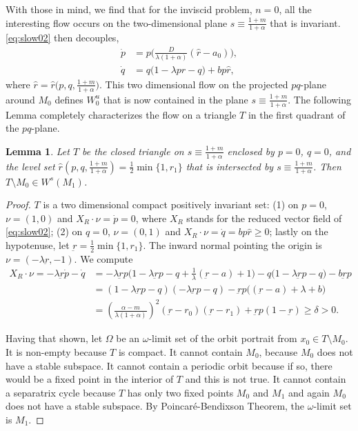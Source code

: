 \documentclass[a4paper,11pt]{article}
\newtheorem{lemma}{Lemma}[section]
\theoremstyle{remark}
\begin{document}
With those in mind, we find that for the inviscid problem, $n=0$, all the interesting flow occurs on the two-dimensional plane $s\equiv \frac{1+m}{1+\alpha}$ that is invariant. \eqref{eq:slow02} then decouples,
\begin{equation}\label{eq:slow03}
 \begin{aligned}
 \dot{p} &= p\Big(\frac{D}{\lambda(1+\alpha)}(\hat{r}-a_0)\Big),\\
 \dot{q} &= q\Big(1 -\lambda p \hat{r} -q\Big) + b p \hat{r}, 
 \end{aligned}
\end{equation}
where $\hat{r}=\hat{r}\big(p,q,\frac{1+m}{1+\alpha}\big)$. This two dimensional flow on the projected $pq$-plane around $M_0$ defines $W_0^u$ that is now contained in the plane $s\equiv \frac{1+m}{1+\alpha}$.
The following Lemma completely characterizes the flow on a triangle $T$ in the first quadrant of the $pq$-plane. 
\begin{lemma} \label{lem:T}
 Let $T$ be the closed triangle on $s\equiv \frac{1+m}{1+\alpha}$ enclosed by $p=0$, $q=0$, and the level set $\hat{r}(p,q,\frac{1+m}{1+\alpha})= \frac{1}{2}\min\{1,r_1\}$ that is intersected by $s\equiv \frac{1+m}{1+\alpha}$. 
 Then $T\setminus M_0 \in W^s(M_1)$.
\end{lemma}
\begin{proof}
$T$ is a two dimensional compact positively invariant set: (1) on $p=0$, $\nu = (1,0)$ and $X_R\cdot\nu = \dot{p}=0$, where $X_R$ stands for the reduced vector field of \eqref{eq:slow02};
 (2) on $q=0$, $\nu = (0,1)$ and $X_R\cdot\nu=\dot{q} = bp\hat{r}\ge0$; lastly on the hypotenuse, let $\underbar{r}=\frac{1}{2}\min\{1,r_1\}$. The inward normal pointing the origin is $\nu = (-\lambda\underbar{r}, -1)$. We compute
  \begin{align}
  X_R\cdot\nu=-\lambda\underbar{r}\dot{p} -\dot{q}&= -\lambda \underbar{r}p \Big(1-\lambda \underbar{r}p -q + \frac{1}{\lambda}(\underbar{r}-a)+1\Big) - q(1-\lambda \underbar{r}p -q\big) - b \underbar{r}p \nonumber\\
  &= (1-\lambda \underbar{r}p -q)(-\lambda \underbar{r}p -q) -\underbar{r}p\Big((\underbar{r}-a)+\lambda+b\Big)\nonumber\\
  &= \left(\frac{\alpha-m}{\lambda(1+\alpha)}\right)^2(\underbar{r}-r_0)(\underbar{r}-r_1)+\underbar{r}p(1-\underbar{r})\ge \delta>0. \label{eq:affine}
 \end{align}

Having that shown, let $\Omega$ be an $\omega$-limit set of the orbit portrait from $x_0\in T\setminus M_0$. It is non-empty because $T$ is compact. It cannot contain $M_0$, because $M_0$ does not have a stable subspace. It cannot contain a periodic orbit because if so, there would be a fixed point in the interior of $T$ and this is not true. 
It cannot contain a separatrix cycle because $T$ has only two fixed points $M_0$ and $M_1$ and again $M_0$ does not have a stable subspace.  By Poincar\'e-Bendixson Theorem, the $\omega$-limit set is $M_1$.
\end{proof}
\end{document}
